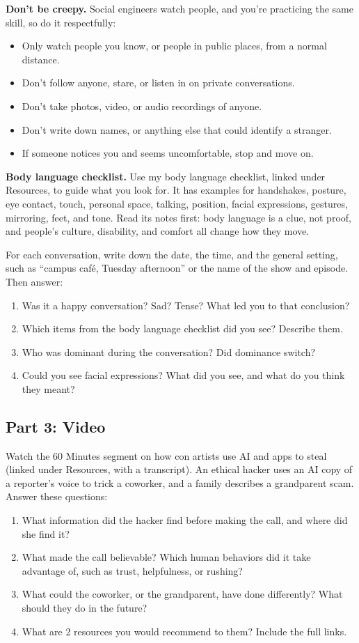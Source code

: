 \documentclass[12pt]{article}
\begin{document}
\textbf{Don't be creepy.} Social engineers watch people, and you're practicing the same skill, so do it respectfully:
\begin{itemize}
    \item Only watch people you know, or people in public places, from a normal distance.
    \item Don't follow anyone, stare, or listen in on private conversations.
    \item Don't take photos, video, or audio recordings of anyone.
    \item Don't write down names, or anything else that could identify a stranger.
    \item If someone notices you and seems uncomfortable, stop and move on.
\end{itemize}

\textbf{Body language checklist.} Use my body language checklist, linked under Resources, to guide what you look for. It has examples for handshakes, posture, eye contact, touch, personal space, talking, position, facial expressions, gestures, mirroring, feet, and tone. Read its notes first: body language is a clue, not proof, and people's culture, disability, and comfort all change how they move.

For each conversation, write down the date, the time, and the general setting, such as ``campus café, Tuesday afternoon'' or the name of the show and episode. Then answer:
\begin{enumerate}
    \item Was it a happy conversation? Sad? Tense? What led you to that conclusion?
    \item Which items from the body language checklist did you see? Describe them.
    \item Who was dominant during the conversation? Did dominance switch?
    \item Could you see facial expressions? What did you see, and what do you think they meant?
\end{enumerate}

\subsection*{Part 3: Video}
Watch the 60 Minutes segment on how con artists use AI and apps to steal (linked under Resources, with a transcript). An ethical hacker uses an AI copy of a reporter's voice to trick a coworker, and a family describes a grandparent scam. Answer these questions:
\begin{enumerate}[start=5]
    \item What information did the hacker find before making the call, and where did she find it?
    \item What made the call believable? Which human behaviors did it take advantage of, such as trust, helpfulness, or rushing?
    \item What could the coworker, or the grandparent, have done differently? What should they do in the future?
    \item What are 2 resources you would recommend to them? Include the full links.
\end{enumerate}
\end{document}
